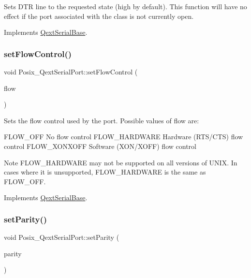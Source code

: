 Sets D\+TR line to the requested state (high by default). This function will have no effect if the port associated with the class is not currently open. 

Implements \mbox{\hyperlink{class_qext_serial_base}{Qext\+Serial\+Base}}.

\mbox{\label{class_posix___qext_serial_port_a8bdd56422fbb95da7216f182a1ef6cfb}} 
\subsubsection{\texorpdfstring{set\+Flow\+Control()}{setFlowControl()}}
{\footnotesize\ttfamily void Posix\+\_\+\+Qext\+Serial\+Port\+::set\+Flow\+Control (\begin{DoxyParamCaption}\item[{Flow\+Type}]{flow }\end{DoxyParamCaption})\hspace{0.3cm}{\ttfamily [virtual]}}

Sets the flow control used by the port. Possible values of flow are\+: \begin{DoxyVerb}    FLOW_OFF            No flow control
    FLOW_HARDWARE       Hardware (RTS/CTS) flow control
    FLOW_XONXOFF        Software (XON/XOFF) flow control
\end{DoxyVerb}
 \begin{DoxyNote}{Note}
F\+L\+O\+W\+\_\+\+H\+A\+R\+D\+W\+A\+RE may not be supported on all versions of U\+N\+IX. In cases where it is unsupported, F\+L\+O\+W\+\_\+\+H\+A\+R\+D\+W\+A\+RE is the same as F\+L\+O\+W\+\_\+\+O\+FF. 
\end{DoxyNote}


Implements \mbox{\hyperlink{class_qext_serial_base}{Qext\+Serial\+Base}}.

\mbox{\label{class_posix___qext_serial_port_a22dedc4f44c33b13f64bff33f844f795}} 
\subsubsection{\texorpdfstring{set\+Parity()}{setParity()}}
{\footnotesize\ttfamily void Posix\+\_\+\+Qext\+Serial\+Port\+::set\+Parity (\begin{DoxyParamCaption}\item[{Parity\+Type}]{parity }\end{DoxyParamCaption})\hspace{0.3cm}{\ttfamily [virtual]}}

